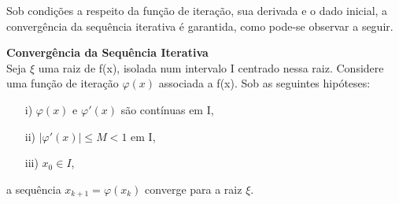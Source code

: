 Sob condições a respeito da função de iteração, sua derivada e o dado inicial, a convergência da sequência iterativa é garantida, como pode-se observar a seguir.
\begin{teo} \textbf{Convergência da Sequência Iterativa} \label{teoMPF}\\
    Seja $\xi$ uma raiz de f(x), isolada num intervalo I centrado nessa raiz. Considere uma função de iteração $\varphi(x)$ associada a f(x). Sob as seguintes hipóteses:
    \begin{itemize}
        \item[i)] $\varphi(x)$ e $\varphi'(x)$ são contínuas em I,
        \item [ii)] $|\varphi'(x)| \leq M < 1$ em I,
        \item [iii)] $x_0 \in I$,
    \end{itemize}
    a sequência $x_{k+1} = \varphi(x_k)$ converge para a raiz $\xi$. 
\end{teo}
